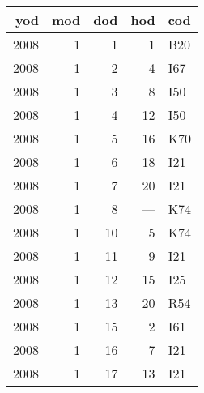\begin{tabular}{rrrrl}
  \toprule
 yod & mod & dod & hod & cod \\ 
  \midrule
  2008 &   1 &   1 &   1 & B20 \\ 
  2008 &   1 &   2 &   4 & I67 \\ 
  2008 &   1 &   3 &   8 & I50 \\ 
  2008 &   1 &   4 &  12 & I50 \\ 
  2008 &   1 &   5 &  16 & K70 \\ 
  2008 &   1 &   6 &  18 & I21 \\ 
  2008 &   1 &   7 &  20 & I21 \\ 
  2008 &   1 &   8 & --- & K74 \\ 
  2008 &   1 &  10 &   5 & K74 \\ 
  2008 &   1 &  11 &   9 & I21 \\ 
  2008 &   1 &  12 &  15 & I25 \\ 
  2008 &   1 &  13 &  20 & R54 \\ 
  2008 &   1 &  15 &   2 & I61 \\ 
  2008 &   1 &  16 &   7 & I21 \\ 
  2008 &   1 &  17 &  13 & I21 \\ 
   \bottomrule
\end{tabular}
